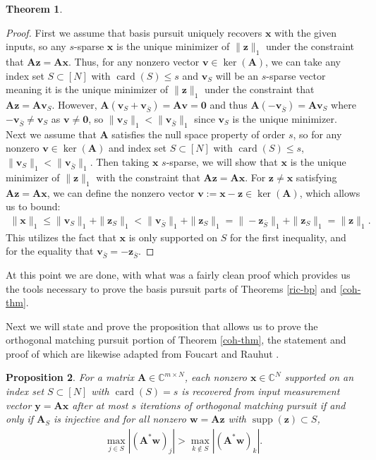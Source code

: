 \documentclass[12pt,a4paper]{amsart}
\numberwithin{equation}{section}
\theoremstyle{plain}
\newtheorem{Th}{Theorem}[section]
\newtheorem{Prop}[Th]{Proposition}
\theoremstyle{definition}
\newcommand{\BC}{\mathbb C}
\newcommand{\bdy}{\mathbf{y}}
\newcommand{\bdx}{\mathbf{x}}
\newcommand{\bdz}{\mathbf{z}}
\newcommand{\bdv}{\mathbf{v}}
\newcommand{\bdw}{\mathbf{w}}
\newcommand{\bdA}{\mathbf{A}}
\DeclareMathOperator{\card}{card}
\DeclareMathOperator{\supp}{supp}
\begin{document}
\begin{appendices}
\begin{Th}
\end{Th}

\begin{proof}
    First we assume that basis pursuit uniquely recovers $\bdx$ with the given inputs, so any $s$-sparse $\bdx$ is the unique minimizer of $\|\bdz\|_1$ under the constraint that $\bdA\bdz=\bdA\bdx$. Thus, for any nonzero vector $\bdv\in\ker(\bdA)$, we can take any index set $S\subset[N]$ with $\card(S)\leq s$ and $\bdv_S$ will be an $s$-sparse vector meaning it is the unique minimizer of $\|\bdz\|_1$ under the constraint that $\bdA\bdz=\bdA\bdv_S$. However, $\bdA(\bdv_S+\bdv_{\bar S})=\bdA\bdv=\mathbf{0}$ and thus $\bdA(-\bdv_{\bar S})=\bdA\bdv_S$ where $-\bdv_{\bar S}\neq\bdv_S$ as $\bdv\neq\mathbf{0}$, so $\|\bdv_S\|_1<\|\bdv_{\bar S}\|_1$ since $\bdv_S$ is the unique minimizer.\\
    
    Next we assume that $\bdA$ satisfies the null space property of order $s$, so for any nonzero $\bdv\in\ker(\bdA)$ and index set $S\subset[N]$ with $\card(S)\leq s$, $\|\bdv_S\|_1<\|\bdv_{\bar S}\|_1$. Then taking $\bdx$ $s$-sparse, we will show that $\bdx$ is the unique minimizer of $\|\bdz\|_1$ with the constraint that $\bdA\bdz=\bdA\bdx$. For $\bdz\neq\bdx$ satisfying $\bdA\bdz=\bdA\bdx$, we can define the nonzero vector $\bdv:=\bdx-\bdz\in\ker(\bdA)$, which allows us to bound:
    \begin{align*}
        \|\bdx\|_1\leq\|\bdv_S\|_1+\|\bdz_S\|_1<\|\bdv_{\bar S}\|_1+\|\bdz_S\|_1=\|-\bdz_{\bar S}\|_1+\|\bdz_S\|_1=\|\bdz\|_1.
    \end{align*}
    This utilizes the fact that $\bdx$ is only supported on $S$ for the first inequality, and for the equality that $\bdv_{\bar S}=-\bdz_{\bar S}$.
\end{proof}

At this point we are done, with what was a fairly clean proof which provides us the tools necessary to prove the basis pursuit parts of Theorems \ref{ric-bp} and \ref{coh-thm}.

Next we will state and prove the proposition that allows us to prove the orthogonal matching pursuit portion of Theorem \ref{coh-thm}, the statement and proof of which are likewise adapted from Foucart and Rauhut \cite{fou-rau}.

\begin{Prop}\label{omp-cond} For a matrix $\bdA\in\BC^{m\times N}$, each nonzero $\bdx\in\BC^N$ supported on an index set $S\subset[N]$ with $\card(S)=s$ is recovered from input measurement vector $\bdy=\bdA\bdx$ after at most $s$ iterations of orthogonal matching pursuit if and only if $\bdA_S$ is injective and for all nonzero $\bdw=\bdA\bdz$ with $\supp(\bdz)\subset S$,
\begin{align}\label{omp-cond-ineq}
    \max_{j\in S}|(\bdA^*\bdw)_j|>\max_{k\notin S}|(\bdA^*\bdw)_k|.
\end{align}
\end{Prop}


\end{appendices}
\end{document}
